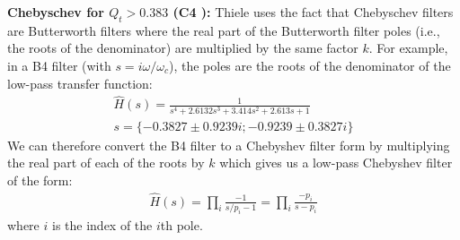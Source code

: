 \documentclass[10pt,letterpaper]{book}
\begin{document}
\textbf{Chebyschev for $Q_t>0.383$ (C4 ):} Thiele uses the fact that Chebyschev filters are Butterworth filters where the real part of the Butterworth filter poles (i.e., the roots of the denominator) are multiplied by the same factor $k$. For example, in a B4 filter (with $s=i\omega/\omega_c$), the poles are the roots of the denominator of the low-pass transfer function:
\begin{align}
\hat{H}(s)=\frac{1}{
s^4+2.6132s^3+3.414s^2+2.613s+1}\\
s=\{-0.3827\pm 0.9239i;-0.9239 \pm 0.3827i\}\label{eq:cheby_roots}
\end{align}
We can therefore convert the B4 filter to a Chebyshev filter form by multiplying the real part of each of the roots by $k$ which gives us a low-pass Chebyshev filter of the form:
\begin{align}
\hat{H}(s)= \prod_i \frac{-1}{ s/p_i-1 }= \prod_i  \frac{-p_i}{ s-p_i }
\end{align}
where $i$ is the index of the $i$th pole.
\end{document}
